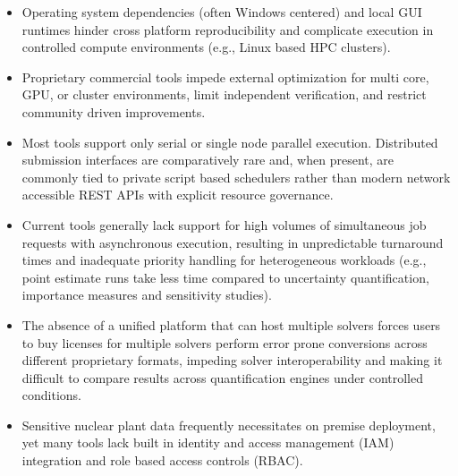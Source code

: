 \begin{itemize}

  \item Operating system dependencies (often Windows centered) and local GUI runtimes hinder cross platform reproducibility and complicate execution in controlled compute environments (e.g., Linux based HPC clusters).

  \item Proprietary commercial tools impede external optimization for multi core, GPU, or cluster environments, limit independent verification, and restrict community driven improvements.
  

  \item Most tools support only serial or single node parallel execution. Distributed submission interfaces are comparatively rare and, when present, are commonly tied to private script based schedulers rather than modern network accessible REST APIs with explicit resource governance.

  \item Current tools generally lack support for high volumes of simultaneous job requests with asynchronous execution, resulting in unpredictable turnaround times and inadequate priority handling for heterogeneous workloads (e.g., point estimate runs take less time compared to uncertainty quantification, importance measures and sensitivity studies).

  \item The absence of a unified platform that can host multiple solvers forces users to buy licenses for multiple solvers perform error prone conversions across different proprietary formats, impeding solver interoperability and making it difficult to compare results across quantification engines under controlled conditions.

  \item Sensitive nuclear plant data frequently necessitates on premise deployment, yet many tools lack built in identity and access management (IAM) integration and role based access controls (RBAC).


\end{itemize}
